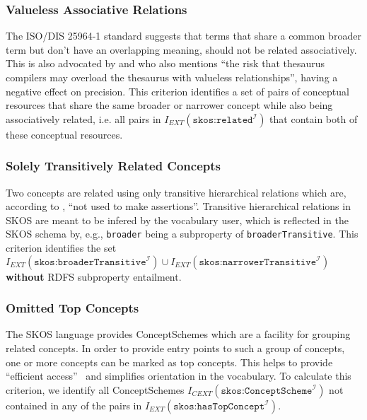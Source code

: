 \subsubsection{Valueless Associative Relations}
The ISO/DIS 25964-1 standard suggests that terms that share a common broader term but don’t have an overlapping meaning, should not be related associatively. This is also advocated by \cite{Hedden2010} and \cite{Aitchison2000} who also mentions ``the risk that thesaurus compilers may overload the thesaurus with valueless relationships'', having a negative effect on precision. This criterion identifies a set of pairs of conceptual resources that share the same broader or narrower concept while also being associatively related, i.e. all pairs in $I_{EXT}(\texttt{skos:related}^\mathcal{I})$ that contain both of these conceptual resources.

\subsubsection{Solely Transitively Related Concepts}
Two concepts are related using only transitive hierarchical relations which are, according to \cite{SkosReference2008}, ``not used to make assertions''. Transitive hierarchical relations in SKOS are meant to be infered by the vocabulary user, which is reflected in the SKOS schema by, e.g., \texttt{broader} being a subproperty of \texttt{broaderTransitive}. This criterion identifies the set $I_{EXT}(\texttt{skos:broaderTransitive}^\mathcal{I}) \cup I_{EXT}(\texttt{skos:narrowerTransitive}^\mathcal{I})$ \textbf{without} RDFS subproperty entailment.

\subsubsection{Omitted Top Concepts}
The SKOS language provides ConceptSchemes which are a facility for grouping related concepts. In order to provide entry points to such a group of concepts, one or more concepts can be marked as top concepts. This helps to provide ``efficient access''~\cite{Isaac2009} and simplifies orientation in the vocabulary. To calculate this criterion, we identify all ConceptSchemes $I_{CEXT}(\texttt{skos:ConceptScheme}^\mathcal{I})$ not contained in any of the pairs in $I_{EXT}(\texttt{skos:hasTopConcept}^\mathcal{I})$.


